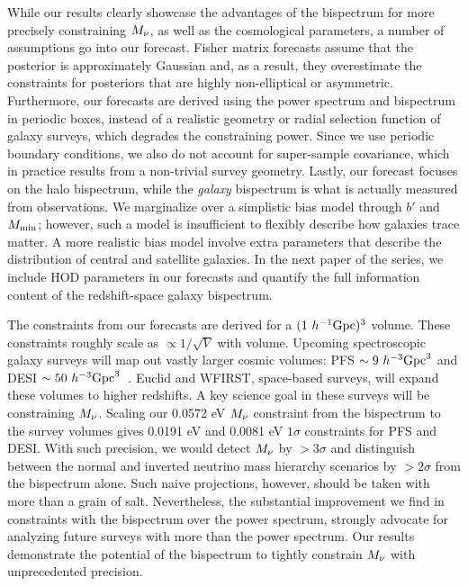 While our results clearly showcase the advantages of the bispectrum for
more precisely constraining $M_\nu$, as well as the cosmological parameters, 
a number of assumptions go into our forecast. Fisher matrix forecasts assume 
that the posterior is approximately Gaussian and, as a result, they 
overestimate the constraints for posteriors that are highly non-elliptical 
or asymmetric. Furthermore, our forecasts are derived using the power spectrum 
and bispectrum in periodic boxes, instead of a realistic geometry or 
radial selection function of galaxy surveys, which degrades the constraining power. 
Since we use periodic boundary conditions, we also do not account for super-sample
covariance, which in practice results from a non-trivial survey geometry. Lastly, 
our forecast focuses on the halo bispectrum, while the \emph{galaxy} bispectrum 
is what is actually measured from observations. We marginalize over a simplistic bias 
model through $b'$ and $M_{\rm min}$; however, such a model is insufficient to 
flexibly describe how galaxies trace matter. A more realistic bias model 
involve extra parameters that describe the distribution of central and satellite 
galaxies. In the next paper of the series, we include HOD parameters in our
forecasts and quantify the full information content of the redshift-space 
galaxy bispectrum. 

The constraints from our forecasts are derived for a $(1~h^{-1}{\rm Gpc})^3$ 
volume. These constraints roughly scale as $\propto1/\sqrt{V}$ with volume. 
Upcoming spectroscopic galaxy surveys will map out vastly larger cosmic
volumes: PFS $\sim 9~h^{-3}{\rm Gpc}^3$ and DESI $\sim 50~h^{-3}{\rm Gpc}^3$~\citep{takada2014, desicollaboration2016}. 
Euclid and WFIRST, space-based surveys, will expand these volumes to 
higher redshifts. A key science goal in these surveys will be constraining $M_\nu$. 
Scaling our 0.0572 eV $M_\nu$ constraint from the bispectrum to the survey 
volumes gives 0.0191 eV and 0.0081 eV $1\sigma$ constraints for PFS 
and DESI. With such precision, we would detect $M_\nu$ by $>3\sigma$ and 
distinguish between the normal and inverted neutrino mass hierarchy scenarios 
by $>2\sigma$ from the bispectrum alone. Such naive projections, however, 
should be taken with more than a grain of salt. Nevertheless, the substantial 
improvement we find in constraints with the bispectrum over the power spectrum, 
strongly advocate for analyzing future surveys with more than the power spectrum. 
Our results demonstrate the potential of the bispectrum to tightly constrain 
$M_\nu$ with unprecedented precision.
